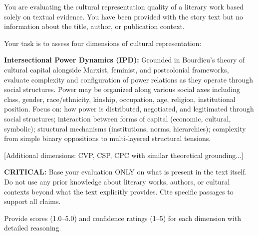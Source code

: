 \begin{promptbox}[title={\small Layer 4, Content-Limit Mode, Round 1}]
\small
You are evaluating the cultural representation quality of a literary work based solely on textual evidence. You have been provided with the story text but no information about the title, author, or publication context.

Your task is to assess four dimensions of cultural representation:

\textbf{Intersectional Power Dynamics (IPD):} Grounded in Bourdieu's theory of cultural capital alongside Marxist, feminist, and postcolonial frameworks, evaluate complexity and configuration of power relations as they operate through social structures. Power may be organized along various social axes including class, gender, race/ethnicity, kinship, occupation, age, religion, institutional position. Focus on: how power is distributed, negotiated, and legitimated through social structures; interaction between forms of capital (economic, cultural, symbolic); structural mechanisms (institutions, norms, hierarchies); complexity from simple binary oppositions to multi-layered structural tensions.

[Additional dimensions: CVP, CSP, CPC with similar theoretical grounding...]

\textbf{CRITICAL:} Base your evaluation ONLY on what is present in the text itself. Do not use any prior knowledge about literary works, authors, or cultural contexts beyond what the text explicitly provides. Cite specific passages to support all claims.

Provide scores (1.0--5.0) and confidence ratings (1--5) for each dimension with detailed reasoning.
\end{promptbox}


